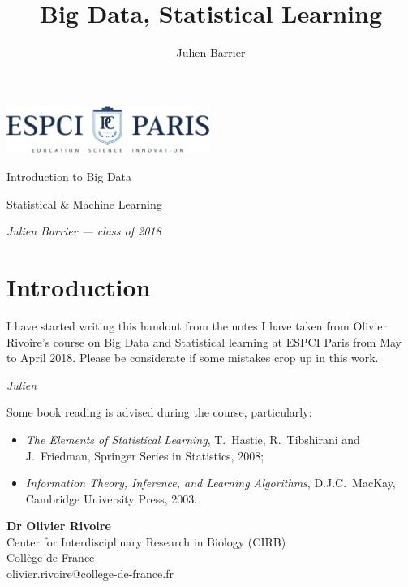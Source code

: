 \documentclass[a4paper]{tufte-book}
\title{Big Data, Statistical Learning}
\author{Julien Barrier}
\newcommand{\thetitle}{Introduction to Big Data}
\newcommand{\theauthor}{Julien Barrier --- class of 2018}
\newcommand{\pc}{ESPCI Paris}
\newcommand{\thesubtitle}{Statistical \& Machine Learning}
\begin{document}
\frontmatter

\thispagestyle{empty}
\begin{fullwidth}
    \setlength{\parindent}{0pt}
    \begin{center}
        \fontsize{24}{24}\selectfont\textit{
            \includegraphics*[width=2.6in]{ESPCI_baseline_couleur}
        }
    \end{center}
    \vspace{3in}\fontsize{36}{54}\selectfont\thetitle

    \vspace{0.125in}\fontsize{18}{18}\selectfont\thesubtitle

    \vfill\fontsize{14}{14}\selectfont\textit{\theauthor}
\end{fullwidth}

\newpage

\cleardoublepage
\chapter*{Introduction}

I have started writing this handout from the notes I have taken from Olivier Rivoire's course on
Big Data and Statistical learning at \pc{} from May to April 2018. 
Please be considerate if some mistakes crop up in this work.

\emph{Julien}
\vspace{1cm}

Some book reading is advised during the course, particularly:

\begin{itemize}
    \item \emph{The Elements of Statistical Learning}, T.~Hastie, R.~Tibshirani and J.~Friedman, Springer Series in Statistics, 2008;
    \item \emph{Information Theory, Inference, and Learning Algorithms}, D.J.C.~MacKay, Cambridge University Press, 2003.
\end{itemize}

\vspace{1cm}

\textbf{Dr Olivier Rivoire}\\
Center for Interdisciplinary Research in Biology (CIRB)\\
Collège de France\\
olivier.rivoire@college-de-france.fr\\
\end{document}
